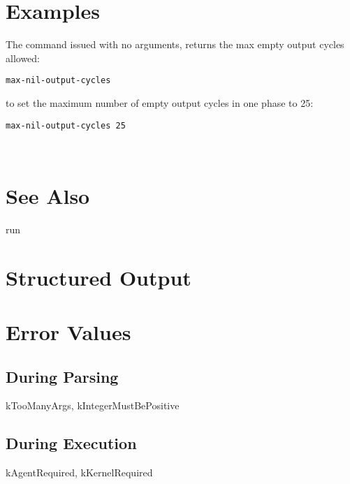 \documentclass[10pt]{article}
\begin{document}
\section*{ Examples }


 The command issued with no arguments, returns the max empty output cycles allowed: \begin{verbatim}
max-nil-output-cycles 

\end{verbatim}



 to set the maximum number of empty output cycles in one phase to 25: \begin{verbatim}
max-nil-output-cycles 25 

\end{verbatim}



 \\ 

\section*{ See Also }


 run
\section*{ Structured Output }
\section*{ Error Values }
\subsection*{ During Parsing }


 kTooManyArgs, kIntegerMustBePositive
\subsection*{ During Execution }


 kAgentRequired, kKernelRequired
\end{document}
